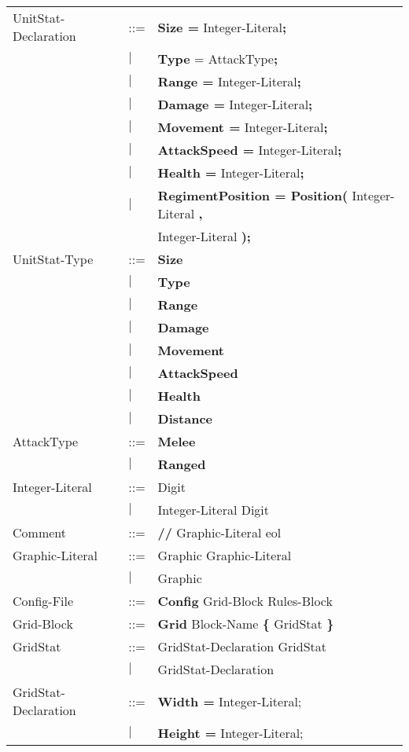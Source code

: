 \begin{center}
\begin{longtable}{l l l}
UnitStat-Declaration		&	::=	&{\bf Size =} Integer-Literal{\bf ;} \\
							&$\mid$	&{\bf Type} = AttackType{\bf ;}\\
							&$\mid$	&{\bf  Range =} Integer-Literal{\bf;}\\
							&$\mid$	&{\bf Damage =} Integer-Literal{\bf ;}\\
							&$\mid$	&{\bf Movement = }Integer-Literal{\bf ;} \\				  
							&$\mid$	&{\bf AttackSpeed = }Integer-Literal{\bf ;} \\				  
							&$\mid$	&{\bf Health = }Integer-Literal{\bf ;} \\				  
							&$\mid$	& {\bf RegimentPosition = Position(} Integer-Literal {\bf ,}\\
							&		& Integer-Literal {\bf );}\\
UnitStat-Type				&	::=	&{\bf Size}\\
							&$\mid$	&{\bf Type}\\
							&$\mid$	&{\bf Range}\\
							&$\mid$	&{\bf Damage}\\
							&$\mid$	&{\bf Movement}\\
							&$\mid$	&{\bf AttackSpeed}\\
							&$\mid$	&{\bf Health}\\
							&$\mid$	&{\bf Distance}\\
AttackType					&	::=	&{\bf Melee}\\
							&$\mid$	&{\bf Ranged}\\
Integer-Literal				&	::=	&Digit\\
							&$\mid$	&Integer-Literal Digit\\
Comment						&	::=	&{\bf //} Graphic-Literal eol\\
Graphic-Literal				&	::=	&Graphic Graphic-Literal\\
							&$\mid$	&Graphic\\
Config-File					&	::=	&{\bf Config} Grid-Block Rules-Block\\
Grid-Block					&	::=	&{\bf Grid} Block-Name	 {\bf \{} GridStat \bf{\}}\\
GridStat					&	::=	&GridStat-Declaration GridStat\\
							&$\mid$	&GridStat-Declaration \\
GridStat-Declaration		&	::=	&{\bf Width = } Integer-Literal;\\
							&$\mid$	&{\bf Height = } Integer-Literal;\\

\end{longtable}
\end{center}
